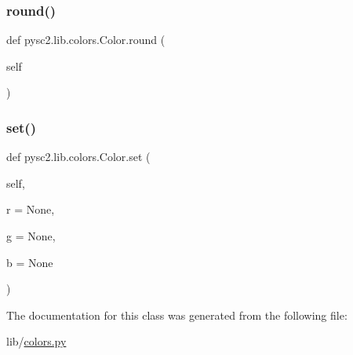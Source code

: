 \mbox{\label{classpysc2_1_1lib_1_1colors_1_1_color_a38a169169ccba8887056f2411b48919a}} 
\subsubsection{\texorpdfstring{round()}{round()}}
{\footnotesize\ttfamily def pysc2.\+lib.\+colors.\+Color.\+round (\begin{DoxyParamCaption}\item[{}]{self }\end{DoxyParamCaption})}

\mbox{\label{classpysc2_1_1lib_1_1colors_1_1_color_a4f85933c31b5eee882ee02bc276c2910}} 
\subsubsection{\texorpdfstring{set()}{set()}}
{\footnotesize\ttfamily def pysc2.\+lib.\+colors.\+Color.\+set (\begin{DoxyParamCaption}\item[{}]{self,  }\item[{}]{r = {\ttfamily None},  }\item[{}]{g = {\ttfamily None},  }\item[{}]{b = {\ttfamily None} }\end{DoxyParamCaption})}



The documentation for this class was generated from the following file\+:\begin{DoxyCompactItemize}
\item 
lib/\mbox{\hyperlink{colors_8py}{colors.\+py}}\end{DoxyCompactItemize}
